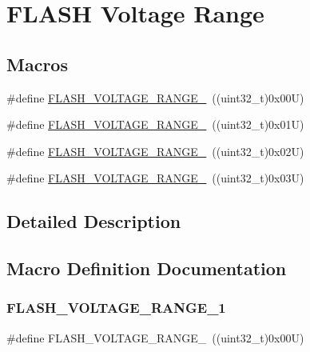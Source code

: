 \hypertarget{group___f_l_a_s_h_ex___voltage___range}{}\section{F\+L\+A\+SH Voltage Range}
\label{group___f_l_a_s_h_ex___voltage___range}
\subsection*{Macros}
\begin{DoxyCompactItemize}
\item 
\#define \mbox{\hyperlink{group___f_l_a_s_h_ex___voltage___range_ga5cadf49a63c968cde3b980e5139d398e}{F\+L\+A\+S\+H\+\_\+\+V\+O\+L\+T\+A\+G\+E\+\_\+\+R\+A\+N\+G\+E\+\_}}~((uint32\+\_\+t)0x00\+U)
\item 
\#define \mbox{\hyperlink{group___f_l_a_s_h_ex___voltage___range_gad047be2bc7aa9be946b5b0c6b3062ef3}{F\+L\+A\+S\+H\+\_\+\+V\+O\+L\+T\+A\+G\+E\+\_\+\+R\+A\+N\+G\+E\+\_}}~((uint32\+\_\+t)0x01\+U)
\item 
\#define \mbox{\hyperlink{group___f_l_a_s_h_ex___voltage___range_ga50950407a789684eec9216f49e0831a0}{F\+L\+A\+S\+H\+\_\+\+V\+O\+L\+T\+A\+G\+E\+\_\+\+R\+A\+N\+G\+E\+\_}}~((uint32\+\_\+t)0x02\+U)
\item 
\#define \mbox{\hyperlink{group___f_l_a_s_h_ex___voltage___range_gabf8037a482f18815c5a67f287223a658}{F\+L\+A\+S\+H\+\_\+\+V\+O\+L\+T\+A\+G\+E\+\_\+\+R\+A\+N\+G\+E\+\_}}~((uint32\+\_\+t)0x03\+U)
\end{DoxyCompactItemize}


\subsection{Detailed Description}


\subsection{Macro Definition Documentation}
\mbox{\label{group___f_l_a_s_h_ex___voltage___range_ga5cadf49a63c968cde3b980e5139d398e}} 
\subsubsection{\texorpdfstring{FLASH\_VOLTAGE\_RANGE\_1}{FLASH\_VOLTAGE\_RANGE\_1}}
{\footnotesize\ttfamily \#define F\+L\+A\+S\+H\+\_\+\+V\+O\+L\+T\+A\+G\+E\+\_\+\+R\+A\+N\+G\+E\+\_~((uint32\+\_\+t)0x00\+U)}


